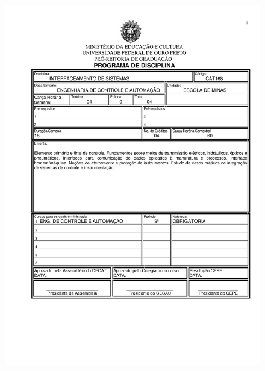 \begin{figure}[p]
	\centering 
	\includegraphics[scale=0.7]{capitulos/anexo1-programas-disciplina/p82.pdf}
\end{figure}

